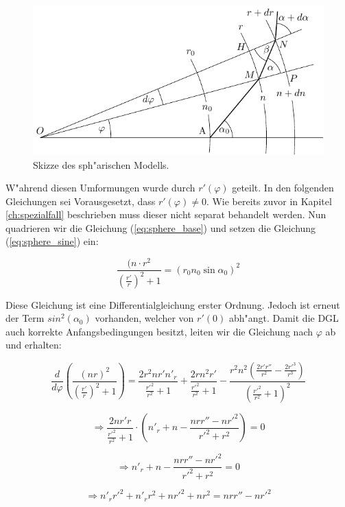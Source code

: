 \begin{refsection}
\begin{figure} 
\centering
\includegraphics[scale=1]{licht/standalone/fig_sphere_skizze.pdf}
\caption{Skizze des sph"arischen Modells. \label{fig:sphere_skizze}}
\end{figure}

W"ahrend diesen Umformungen wurde durch $r'(\varphi)$ geteilt. 
In den folgenden Gleichungen sei Vorausgesetzt, dass $r'(\varphi) \neq 0$. 
Wie bereits zuvor in Kapitel \ref{ch:spezialfall} beschrieben muss dieser nicht separat behandelt werden.
Nun quadrieren wir die Gleichung (\ref{eq:sphere_base}) und setzen die Gleichung (\ref{eq:sphere_sine}) ein:

$$\frac{(n \cdot r^2}{\left( \frac{r'}{r} \right)^2 +1} = (r_0 n_0 \sin \alpha_0)^2$$

Diese Gleichung ist eine Differentialgleichung erster Ordnung. 
Jedoch ist erneut der Term $sin^2(\alpha_0)$ vorhanden, welcher von $r'(0)$ abh"angt. 
Damit die DGL auch korrekte Anfangsbedingungen besitzt, leiten wir die Gleichung nach $\varphi$ ab und erhalten:

$$\frac{d}{d\varphi}\left(\frac{(n r)^2}{\left(\frac{r'}{r}\right)^2 + 1}\right) =  \frac{2 r^2 n r' n'_r}{\frac{r'^2}{r^2}+1}+\frac{2 r n^2 r'}{\frac{r'^2}{r^2}+1}-\frac{r^2 n^2 \left(\frac{2 r' r''}{r^2}-\frac{2 r'^3}{r^3}\right)}{\left(\frac{r'^2}{r^2}+1\right)^2}$$

$$\Rightarrow \frac{2n r' r}{\frac{r'^2}{r^2}+1} \cdot \left( n'_r + n - \frac{n r r'' - n r'^2}{r'^2 + r^2} \right) = 0$$

\begin{equation} \label{eq:sphere_origin}
\Rightarrow n'_r + n - \frac{n r r'' - n r'^2}{r'^2 + r^2} = 0
\end{equation}

$$\Rightarrow n'_r r'^2  + n'_r r^2 + n r'^2 + nr^2 = n r r'' - n r'^2$$


\end{refsection}
